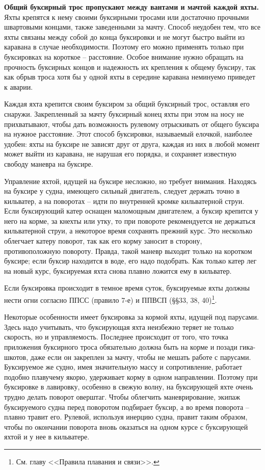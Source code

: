 \documentclass[a4paper, 12pt, twoside, final]{scrbook}
\begin{document}
\textbf{Общий буксирный трос пропускают между вантами и мачтой каждой яхты.} Яхты крепятся к нему своими буксирными тросами или достаточно прочными швартовыми концами, также заведенными за мачту. Способ неудобен тем, что все яхты связаны между собой до конца буксировки и не могут быстро выйти из каравана в случае необходимости. Поэтому его можно применять только при буксировках на короткое \--- расстояние. Особое внимание нужно обращать на прочность буксирных концов и надежность их крепления к общему буксиру, так как обрыв троса хотя бы у одной яхты в середине каравана неминуемо приведет к аварии. 

Каждая яхта крепится своим буксиром за общий буксирный трос, оставляя его снаружи. Закрепленный за мачту буксирный конец яхты при этом на носу не прихватывают, чтобы дать возможность рулевому отрыскивать от общего буксира на нужное расстояние. Этот способ буксировки, называемый елочкой, наиболее удобен: яхты на буксире не зависят друг от друга, каждая из них в любой момент может выйти из каравана, не нарушая его порядка, и сохраняет известную свободу маневра на буксире.

Управление яхтой, идущей на буксире несложно, но требует внимания. Находясь на буксире у судна, имеющего сильный двигатель, следует держать точно в кильватер, а на поворотах \--- идти по внутренней кромке кильватерной струи. Если буксирующий катер оснащен маломощным двигателем, а буксир крепится у него на корме, за кнехты или утку, то при повороте рекомендуется не держаться кильватерной струи, а некоторое время сохранять прежний курс. Это несколько облегчает катеру поворот, так как его корму заносит в сторону, противоположную повороту. Правда, такой маневр выходит только на коротком буксире; если буксир находится в воде, его надо подобрать. Как только катер лег на новый курс, буксируемая яхта снова плавно ложится ему в кильватер.

Если буксировка происходит в темное время суток, буксируемые яхты должны нести огни согласно ППСС (правило 7-е) и ППВСП (\S\S 33, 38, 40)\footnote{См. главу <<Правила плавания и связи>>.}.

Некоторые особенности имеет буксировка за кормой яхты, идущей под парусами. Здесь надо учитывать, что буксирующая яхта неизбежно теряет не только скорость, но и управляемость. Последнее происходит от того, что точка приложения буксирного троса обязательно должна быть на корме и позади гика-шкотов, даже если он закреплен за мачту, чтобы не мешать работе с парусами. Буксируемое же судно, имея значительную массу и сопротивление, работает подобно плавучему якорю, удерживает корму в одном направлении. Поэтому при буксировке в лавировку, особенно в свежую волну, на буксирующей яхте очень трудно делать поворот оверштаг. Чтобы облегчить маневрирование, экипаж буксируемого судна перед поворотом подбирает буксир, а во время поворота \--- плавно травит его. Рулевой, используя инерцию судна, правит таким образом, чтобы по окончании поворота вновь оказаться на одном курсе с буксирующей яхтой и у нее в кильватере.
\end{document}
